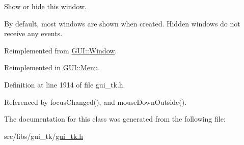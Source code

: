 Show or hide this window. 

By default, most windows are shown when created. Hidden windows do not receive any events. 

Reimplemented from \hyperlink{classGUI_1_1Window_a7cd474e3c89ff37a4295da00f3624cc7}{G\-U\-I\-::\-Window}.



Reimplemented in \hyperlink{classGUI_1_1Menu_aa98bb7305b74088dd875ead6747cfa52}{G\-U\-I\-::\-Menu}.



Definition at line 1914 of file gui\-\_\-tk.\-h.



Referenced by focus\-Changed(), and mouse\-Down\-Outside().



The documentation for this class was generated from the following file\-:\begin{DoxyCompactItemize}
\item 
src/libs/gui\-\_\-tk/\hyperlink{gui__tk_8h}{gui\-\_\-tk.\-h}\end{DoxyCompactItemize}
